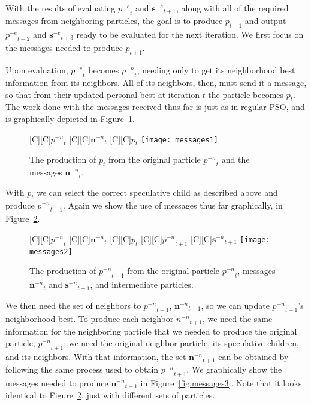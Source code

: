\documentclass[smallcondensed]{svjour3}
\newcommand{\fig}[1]{Figure~\ref{fig:#1}}
\providecommand{\noeval}[1]{\ensuremath{#1^{-e}}}
\providecommand{\nonbest}[1]{\ensuremath{#1^{-n}}}
\providecommand{\p}{\ensuremath{p}}
\providecommand{\sset}{\ensuremath{\mathbf{s}}}
\providecommand{\n}{\ensuremath{n}}
\providecommand{\nset}{\ensuremath{\mathbf{n}}}
\begin{document}
With the results of evaluating $\noeval{\p}_t$ and $\noeval{\sset}_{t+1}$,
along with all of the required messages from neighboring particles, the goal is
to produce $\p_{t+1}$ and output $\noeval{\p}_{t+2}$ and $\noeval{\sset}_{t+3}$
ready to be evaluated for the next iteration.  We first focus on the messages
needed to produce $\p_{t+1}$.

Upon evaluation, $\noeval{\p}_t$ becomes $\nonbest{\p}_t$, needing only to get
its neighborhood best information from its neighbors.  All of its neighbors,
then, must send it a message, so that from their updated personal best at
iteration $t$ the particle becomes $\p_t$.  The work done with the messages
received thus far is just as in regular PSO, and is graphically depicted in 
\fig{messages1}.

\begin{figure}
  \centering
  [C][C]{$\nonbest{\p}_{t}$}
  [C][C]{$\nonbest{\nset}_{t}$}
  [C][C]{$\p_{t}$}
  \texttt{[image: messages1]}
  \caption{The production of $\p_{t}$ from the original particle
  $\nonbest{\p}_{t}$ and the messages $\nonbest{\nset}_{t}$.}
  \label{fig:messages1}
\end{figure}

With $\p_t$ we can select the correct speculative child as described above and
produce $\nonbest{\p}_{t+1}$.  Again we show the use of messages thus far
graphically, in \fig{messages2}.  

\begin{figure}
  \centering
  [C][C]{$\nonbest{\p}_{t}$}
  [C][C]{$\nonbest{\nset}_{t}$}
  [C][C]{$\p_{t}$}
  [C][C]{$\nonbest{\p}_{t+1}$}
  [C][C]{$\nonbest{\sset}_{t+1}$}
  \texttt{[image: messages2]}
  \caption{The production of $\nonbest{\p}_{t+1}$ from the original particle 
  $\nonbest{\p}_{t}$, messages $\nonbest{\nset}_{t}$ and
  $\nonbest{\sset}_{t+1}$, and intermediate particles.}
  \label{fig:messages2}
\end{figure}

We then need the set of neighbors to $\nonbest{\p}_{t+1}$,
$\nonbest{\nset}_{t+1}$, so we can update $\nonbest{\p}_{t+1}$'s neighborhood
best.  To produce each neighbor $\nonbest{\n}_{t+1}$, we need the same
information for the neighboring particle that we needed to produce the original
particle, $\nonbest{\p}_{t+1}$; we need the original neighbor particle, its
speculative children, and its neighbors.  With that information, the set
$\nonbest{\nset}_{t+1}$ can be obtained by following the same process used to
obtain $\nonbest{\p}_{t+1}$.  We graphically show the messages needed to
produce $\nonbest{\nset}_{t+1}$ in \fig{messages3}.  Note that it looks
identical to \fig{messages2}, just with different sets of particles.
\end{document}
